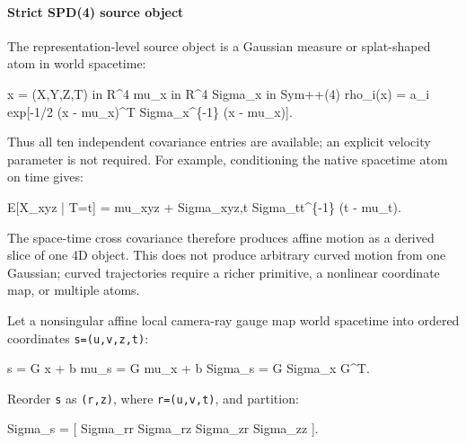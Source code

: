 \documentclass[
]{article}
\newenvironment{Shaded}{}{}
\newcommand{\NormalTok}[1]{#1}
\begin{document}
\paragraph{Strict SPD(4) source object}\label{strict-spd4-source-object}

The representation-level source object is a Gaussian measure or
splat-shaped atom in world spacetime:

\begin{Shaded}
\begin{Highlighting}[]
\NormalTok{x = (X,Y,Z,T) in R\^{}4}
\NormalTok{mu\_x in R\^{}4}
\NormalTok{Sigma\_x in Sym++(4)}
\NormalTok{rho\_i(x) = a\_i exp[{-}1/2 (x {-} mu\_x)\^{}T Sigma\_x\^{}\{{-}1\} (x {-} mu\_x)].}
\end{Highlighting}
\end{Shaded}

Thus all ten independent covariance entries are available; an explicit
velocity parameter is not required. For example, conditioning the native
spacetime atom on time gives:

\begin{Shaded}
\begin{Highlighting}[]
\NormalTok{E[X\_xyz | T=t]}
\NormalTok{  = mu\_xyz + Sigma\_xyz,t Sigma\_tt\^{}\{{-}1\} (t {-} mu\_t).}
\end{Highlighting}
\end{Shaded}

The space-time cross covariance therefore produces affine motion as a
derived slice of one 4D object. This does not produce arbitrary curved
motion from one Gaussian; curved trajectories require a richer
primitive, a nonlinear coordinate map, or multiple atoms.

Let a nonsingular affine local camera-ray gauge map world spacetime into
ordered coordinates \texttt{s=(u,v,z,t)}:

\begin{Shaded}
\begin{Highlighting}[]
\NormalTok{s = G x + b}
\NormalTok{mu\_s = G mu\_x + b}
\NormalTok{Sigma\_s = G Sigma\_x G\^{}T.}
\end{Highlighting}
\end{Shaded}

Reorder \texttt{s} as \texttt{(r,z)}, where \texttt{r=(u,v,t)}, and
partition:

\begin{Shaded}
\begin{Highlighting}[]
\NormalTok{Sigma\_s =}
\NormalTok{  [ Sigma\_rr  Sigma\_rz}
\NormalTok{    Sigma\_zr  Sigma\_zz ].}
\end{Highlighting}
\end{Shaded}
\end{document}
